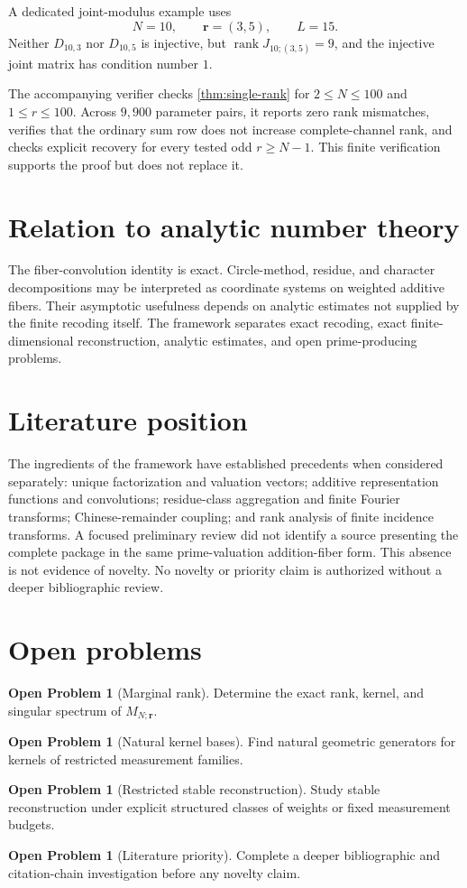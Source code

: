 \documentclass[11pt]{article}
\theoremstyle{definition}
\newtheorem{openproblem}[theorem]{Open Problem}
\newcommand{\rank}{\operatorname{rank}}
\begin{document}
A dedicated joint-modulus example uses
\[
N=10,\qquad \mathbf r=(3,5),\qquad L=15.
\]
Neither $D_{10,3}$ nor $D_{10,5}$ is injective, but $\rank J_{10;(3,5)}=9$, and the injective joint matrix has condition number $1$.

The accompanying verifier checks \cref{thm:single-rank} for $2\le N\le100$ and $1\le r\le100$. Across $9{,}900$ parameter pairs, it reports zero rank mismatches, verifies that the ordinary sum row does not increase complete-channel rank, and checks explicit recovery for every tested odd $r\ge N-1$. This finite verification supports the proof but does not replace it.

\section{Relation to analytic number theory}
The fiber-convolution identity is exact. Circle-method, residue, and character decompositions may be interpreted as coordinate systems on weighted additive fibers. Their asymptotic usefulness depends on analytic estimates not supplied by the finite recoding itself. The framework separates exact recoding, exact finite-dimensional reconstruction, analytic estimates, and open prime-producing problems.

\section{Literature position}
The ingredients of the framework have established precedents when considered separately: unique factorization and valuation vectors; additive representation functions and convolutions; residue-class aggregation and finite Fourier transforms; Chinese-remainder coupling; and rank analysis of finite incidence transforms. A focused preliminary review did not identify a source presenting the complete package in the same prime-valuation addition-fiber form. This absence is not evidence of novelty. No novelty or priority claim is authorized without a deeper bibliographic review.

\section{Open problems}
\begin{openproblem}[Marginal rank]
Determine the exact rank, kernel, and singular spectrum of $M_{N;\mathbf r}$.
\end{openproblem}
\begin{openproblem}[Natural kernel bases]
Find natural geometric generators for kernels of restricted measurement families.
\end{openproblem}
\begin{openproblem}[Restricted stable reconstruction]
Study stable reconstruction under explicit structured classes of weights or fixed measurement budgets.
\end{openproblem}
\begin{openproblem}[Literature priority]
Complete a deeper bibliographic and citation-chain investigation before any novelty claim.
\end{openproblem}
\end{document}
